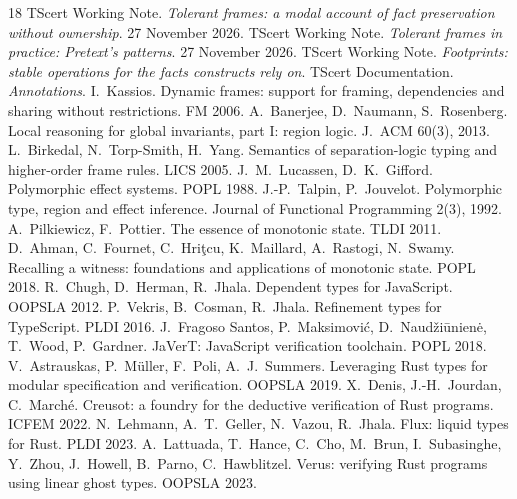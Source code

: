 \documentclass[10pt,a4paper]{article}
\theoremstyle{definition}
\begin{document}
\begin{thebibliography}{18}\small\itemsep1pt
 TScert Working Note. \emph{Tolerant frames: a modal account of fact preservation without ownership}. 27 November 2026.
 TScert Working Note. \emph{Tolerant frames in practice: Pretext's patterns}. 27 November 2026.
 TScert Working Note. \emph{Footprints: stable operations for the facts constructs rely on}.
 TScert Documentation. \emph{Annotations}.
 I.~Kassios. Dynamic frames: support for framing, dependencies and sharing without restrictions. FM 2006.
 A.~Banerjee, D.~Naumann, S.~Rosenberg. Local reasoning for global invariants, part I: region logic. J.~ACM 60(3), 2013.
 L.~Birkedal, N.~Torp-Smith, H.~Yang. Semantics of separation-logic typing and higher-order frame rules. LICS 2005.
 J.~M.~Lucassen, D.~K.~Gifford. Polymorphic effect systems. POPL 1988.
 J.-P.~Talpin, P.~Jouvelot. Polymorphic type, region and effect inference. Journal of Functional Programming 2(3), 1992.
 A.~Pilkiewicz, F.~Pottier. The essence of monotonic state. TLDI 2011.
 D.~Ahman, C.~Fournet, C.~Hri\c{t}cu, K.~Maillard, A.~Rastogi, N.~Swamy. Recalling a witness: foundations and applications of monotonic state. POPL 2018.
 R.~Chugh, D.~Herman, R.~Jhala. Dependent types for JavaScript. OOPSLA 2012.
 P.~Vekris, B.~Cosman, R.~Jhala. Refinement types for TypeScript. PLDI 2016.
 J.~Fragoso Santos, P.~Maksimovi\'c, D.~Naud\v{z}i\=unien\.e, T.~Wood, P.~Gardner. JaVerT: JavaScript verification toolchain. POPL 2018.
 V.~Astrauskas, P.~M\"uller, F.~Poli, A.~J.~Summers. Leveraging Rust types for modular specification and verification. OOPSLA 2019.
 X.~Denis, J.-H.~Jourdan, C.~March\'e. Creusot: a foundry for the deductive verification of Rust programs. ICFEM 2022.
 N.~Lehmann, A.~T.~Geller, N.~Vazou, R.~Jhala. Flux: liquid types for Rust. PLDI 2023.
 A.~Lattuada, T.~Hance, C.~Cho, M.~Brun, I.~Subasinghe, Y.~Zhou, J.~Howell, B.~Parno, C.~Hawblitzel. Verus: verifying Rust programs using linear ghost types. OOPSLA 2023.
\end{thebibliography}
\end{document}
